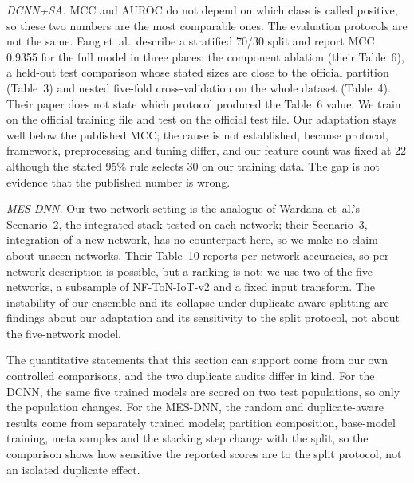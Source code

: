 \documentclass[journal]{IEEEtran}
\begin{document}
\textit{DCNN+SA.} MCC and AUROC do not depend on which class is called positive, so these two
numbers are the most comparable ones. The evaluation protocols are not the same. Fang et~al.\
describe a stratified 70/30 split and report MCC 0.9355 for the full model in three places: the
component ablation (their Table~6), a held-out test comparison whose stated sizes are close to the
official partition (Table~3) and nested five-fold cross-validation on the whole dataset (Table~4).
Their paper does not state which protocol produced the Table~6 value. We train on the official
training file and test on the official test file. Our adaptation stays well below the published
MCC; the cause is not established, because protocol, framework, preprocessing and tuning differ,
and our feature count was fixed at 22 although the stated 95\% rule selects 30 on our training data.
The gap is not evidence that the published number is wrong.

\textit{MES-DNN.} Our two-network setting is the analogue of Wardana et~al.'s Scenario~2, the
integrated stack tested on each network; their Scenario~3, integration of a new network, has no
counterpart here, so we make no claim about unseen networks. Their Table~10 reports per-network
accuracies, so per-network description is possible, but a ranking is not: we use two of the five
networks, a subsample of NF-ToN-IoT-v2 and a fixed input transform. The instability of our
ensemble and its collapse under duplicate-aware splitting are findings about our adaptation and
its sensitivity to the split protocol, not about the five-network model.

The quantitative statements that this section can support come from our own controlled
comparisons, and the two duplicate audits differ in kind. For the DCNN, the same five trained
models are scored on two test populations, so only the population changes. For the MES-DNN, the
random and duplicate-aware results come from separately trained models; partition composition,
base-model training, meta samples and the stacking step change with the split, so the comparison
shows how sensitive the reported scores are to the split protocol, not an isolated duplicate effect.

\end{document}
